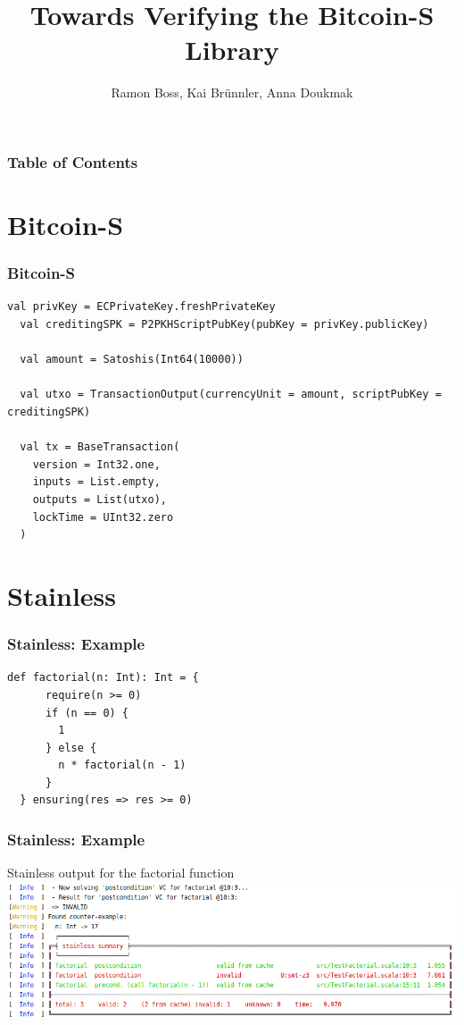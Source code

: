 \documentclass{beamer}
\begin{document}
\title{Towards Verifying the Bitcoin-S Library}

\author{Ramon Boss, Kai Brünnler, Anna Doukmak}


\frame{\titlepage}


\begin{frame}
  \frametitle{Table of Contents}
  \tableofcontents
\end{frame}


\section{Bitcoin-S}

\begin{frame}[fragile]
  \frametitle{Bitcoin-S}
\begin{lstlisting}[style=scala]
  val privKey = ECPrivateKey.freshPrivateKey
  val creditingSPK = P2PKHScriptPubKey(pubKey = privKey.publicKey)

  val amount = Satoshis(Int64(10000))

  val utxo = TransactionOutput(currencyUnit = amount, scriptPubKey = creditingSPK)

  val tx = BaseTransaction(
    version = Int32.one,
    inputs = List.empty,
    outputs = List(utxo),
    lockTime = UInt32.zero
  )
\end{lstlisting}
\end{frame}




\section{Stainless}


\begin{frame}[fragile]
\frametitle{Stainless: Example}
\begin{lstlisting}[style=scala]
  def factorial(n: Int): Int = {
      require(n >= 0)
      if (n == 0) {
        1
      } else {
        n * factorial(n - 1)
      }
  } ensuring(res => res >= 0)
\end{lstlisting}
\end{frame}



\begin{frame}[fragile]
\frametitle{Stainless: Example}
\begin{block}{Stainless output for the factorial function}
	\centering
		\includegraphics[width=\textwidth]{output1.png}
  \end{block}
\end{frame}
\end{document}

